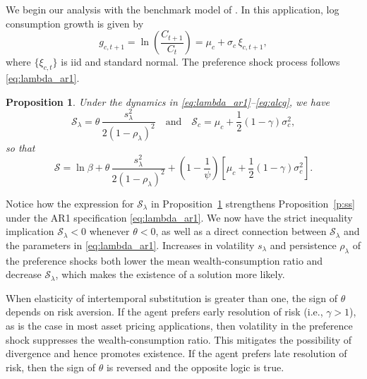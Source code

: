 \documentclass[12pt, reqno]{amsart}
\newcommand{\1}{\mathbbm 1}
\newcommand{\sS}{\mathscr S}
\theoremstyle{plain}
\newtheorem{proposition}[theorem]{Proposition}
\theoremstyle{definition}
\begin{document}
We begin our analysis with the benchmark model of \cite{Albuquerque2016}.
In this application, log consumption growth is given by
%
\begin{equation}\label{eq:alcg}
	g_{c, t+1} 
	= \ln \left( \frac{C_{t+1}}{C_t} \right)    
	= \mu_c + \sigma_{c} \, \xi_{c, t+1},
\end{equation}
%
where $\{\xi_{c, t}\}$  is  {\sc iid} and standard normal.  The preference shock
process follows \eqref{eq:lambda_ar1}.  

\begin{proposition}\label{p:ar1}
    Under the dynamics in \eqref{eq:lambda_ar1}--\eqref{eq:alcg}, we have
	\begin{equation}\label{eq:ml_ar1}
        \sS_\lambda 
            =  \theta \, \frac{s_\lambda^2}{2(1-\rho_\lambda)^2}
            \quad \text{and} \quad
		\sS_c 
            = \mu_c + \frac{1}{2}(1-\gamma) \sigma_c^2,
	\end{equation}
    so that
    \begin{equation}\label{eq:iiss}
    \sS = \ln \beta 
            + \theta \, \frac{s_\lambda^2}{2(1-\rho_\lambda)^2}
            + \left(1-\frac{1}{\psi}\right) 
            \left[
                \mu_c + \frac{1}{2}(1-\gamma) \sigma_c^2
            \right].
    \end{equation}
\end{proposition}


Notice how the expression for $\sS_\lambda$ in Proposition~\ref{p:ar1}
strengthens Proposition~\ref{p:ss} under the AR1 specification
\eqref{eq:lambda_ar1}.  We now have the strict inequality implication
$\sS_\lambda <0$ whenever $\theta<0$, as well as a direct connection between
$\sS_\lambda$ and the parameters in \eqref{eq:lambda_ar1}.  Increases in volatility $s_\lambda$
and persistence $\rho_\lambda$ of the preference shocks both lower the mean
wealth-consumption ratio and decrease $\sS_\lambda$, which makes the existence
of a solution more likely. 

When elasticity of intertemporal substitution is greater than one, the sign of
$\theta$ depends on risk aversion.  If the agent prefers early resolution of
risk (i.e., $\gamma > 1$), as is the case in most asset pricing applications,
then volatility in the preference shock suppresses the wealth-consumption ratio.  This
mitigates the possibility of divergence and hence promotes existence.
If the agent prefers late resolution of
risk, then the sign of $\theta$ is reversed and the opposite logic is true.
\end{document}
